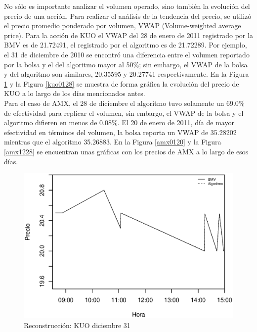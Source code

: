 \documentclass[11pt]{article}
\numberwithin{equation}{section} %
\begin{document}
No sólo es importante analizar el volumen operado, sino también la evolución del precio de una acción. Para realizar el análisis de la tendencia del precio, se utilizó el precio promedio ponderado por volumen, VWAP (Volume-weighted average price). Para la acción de KUO el VWAP del 28 de enero de 2011 registrado por la BMV es de 21.72491, el registrado por el algoritmo es de 21.72289. Por ejemplo, el 31 de diciembre de 2010 se encontró una diferencia entre el volumen reportado por la bolsa y el del algoritmo mayor al 50\%; sin embargo, el VWAP de la bolsa y del algoritmo son similares, 20.35595 y 20.27741 respectivamente. En la Figura \ref{kuo1231} y la Figura \ref{kuo0128} se muestra de forma gráfica la evolución del precio de KUO a lo largo de los días mencionados antes.\\

Para el caso de AMX, el 28 de diciembre el algoritmo tuvo solamente un 69.0\% de efectividad para replicar el volumen, sin embargo, el VWAP de la bolsa y el algoritmo difieren en menos de 0.08\%. El 20 de enero de 2011, día de mayor efectividad en términos del volumen, la bolsa reporta un VWAP de 35.28202 mientras que el algoritmo 35.26883. En la Figura \ref{amx0120} y la Figura \ref{amx1228} se encuentran unas gráficas con los precios de AMX a lo largo de esos días.

\begin{figure}[htbp] \centering
\includegraphics[scale=0.75, trim=0 0.5cm 0 1.5cm]{kuo123110.eps}
\caption{Reconstrucción: KUO diciembre 31}
\label{kuo1231}
\end{figure}
\end{document}
